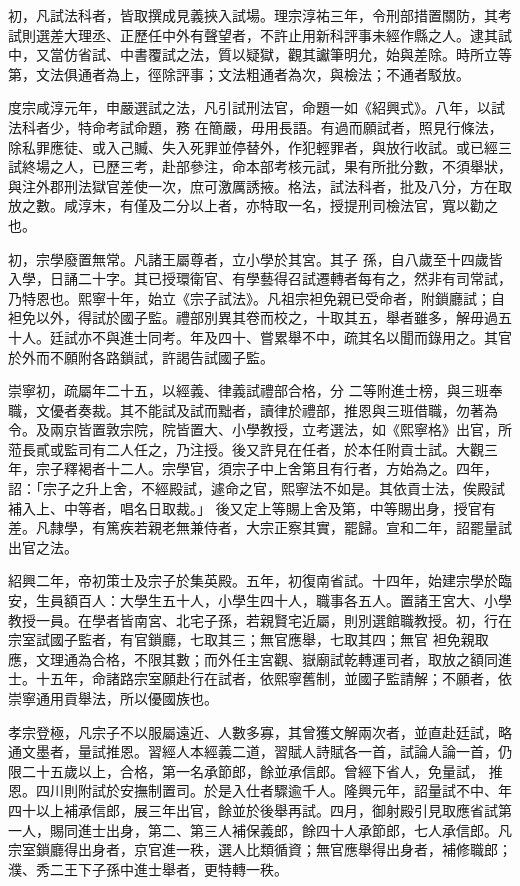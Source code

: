 \begin{pinyinscope}
 初，凡試法科者，皆取撰成見義挾入試場。理宗淳祐三年，令刑部措置關防，其考試則選差大理丞、正歷任中外有聲望者，不許止用新科評事未經作縣之人。逮其試中，又當仿省試、中書覆試之法，質以疑獄，觀其讞筆明允，始與差除。時所立等第，文法俱通者為上，徑除評事；文法粗通者為次，與檢法；不通者駁放。



 度宗咸淳元年，申嚴選試之法，凡引試刑法官，命題一如《紹興式》。八年，以試法科者少，特命考試命題，務
 在簡嚴，毋用長語。有過而願試者，照見行條法，除私罪應徒、或入己贓、失入死罪並停替外，作犯輕罪者，與放行收試。或已經三試終場之人，已歷三考，赴部參注，命本部考核元試，果有所批分數，不須舉狀，與注外郡刑法獄官差使一次，庶可激厲誘掖。格法，試法科者，批及八分，方在取放之數。咸淳末，有僅及二分以上者，亦特取一名，授提刑司檢法官，寬以勸之也。



 初，宗學廢置無常。凡諸王屬尊者，立小學於其宮。其子
 孫，自八歲至十四歲皆入學，日誦二十字。其已授環衛官、有學藝得召試遷轉者每有之，然非有司常試，乃特恩也。熙寧十年，始立《宗子試法》。凡祖宗袒免親已受命者，附鎖廳試；自袒免以外，得試於國子監。禮部別異其卷而校之，十取其五，舉者雖多，解毋過五十人。廷試亦不與進士同考。年及四十、嘗累舉不中，疏其名以聞而錄用之。其官於外而不願附各路鎖試，許謁告試國子監。



 崇寧初，疏屬年二十五，以經義、律義試禮部合格，分
 二等附進士榜，與三班奉職，文優者奏裁。其不能試及試而黜者，讀律於禮部，推恩與三班借職，勿著為令。及兩京皆置敦宗院，院皆置大、小學教授，立考選法，如《熙寧格》出官，所蒞長貳或監司有二人任之，乃注授。後又許見在任者，於本任附貢士試。大觀三年，宗子釋褐者十二人。宗學官，須宗子中上舍第且有行者，方始為之。四年，詔：「宗子之升上舍，不經殿試，遽命之官，熙寧法不如是。其依貢士法，俟殿試補入上、中等者，唱名日取裁。」
 後又定上等賜上舍及第，中等賜出身，授官有差。凡隸學，有篤疾若親老無兼侍者，大宗正察其實，罷歸。宣和二年，詔罷量試出官之法。



 紹興二年，帝初策士及宗子於集英殿。五年，初復南省試。十四年，始建宗學於臨安，生員額百人：大學生五十人，小學生四十人，職事各五人。置諸王宮大、小學教授一員。在學者皆南宮、北宅子孫，若親賢宅近屬，則別選館職教授。初，行在宗室試國子監者，有官鎖廳，七取其三；無官應舉，七取其四；無官
 袒免親取應，文理通為合格，不限其數；而外任主宮觀、嶽廟試乾轉運司者，取放之額同進士。十五年，命諸路宗室願赴行在試者，依熙寧舊制，並國子監請解；不願者，依崇寧通用貢舉法，所以優國族也。



 孝宗登極，凡宗子不以服屬遠近、人數多寡，其曾獲文解兩次者，並直赴廷試，略通文墨者，量試推恩。習經人本經義二道，習賦人詩賦各一首，試論人論一首，仍限二十五歲以上，合格，第一名承節郎，餘並承信郎。曾經下省人，免量試，
 推恩。四川則附試於安撫制置司。於是入仕者驟逾千人。隆興元年，詔量試不中、年四十以上補承信郎，展三年出官，餘並於後舉再試。四月，御射殿引見取應省試第一人，賜同進士出身，第二、第三人補保義郎，餘四十人承節郎，七人承信郎。凡宗室鎖廳得出身者，京官進一秩，選人比類循資；無官應舉得出身者，補修職郎；濮、秀二王下子孫中進士舉者，更特轉一秩。




\end{pinyinscope}
